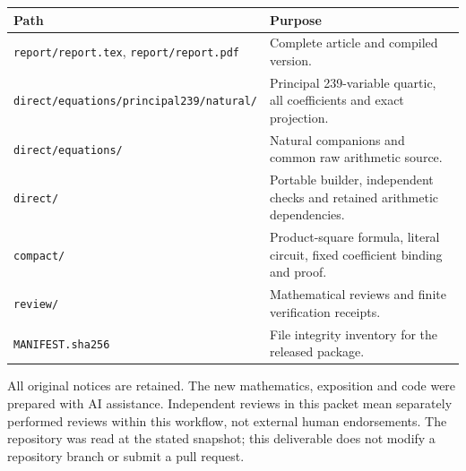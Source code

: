\documentclass[11pt]{article}
\theoremstyle{definition}\newtheorem{definition}[theorem]{Definition}
\theoremstyle{remark}\newtheorem{remark}[theorem]{Remark}
\newcommand{\code}[1]{\nolinkurl{#1}}
\begin{document}
\begin{center}\small
\begin{tabular}{p{}p{}}
\toprule
Path & Purpose\\
\midrule
\code{report/report.tex}, \code{report/report.pdf} & Complete article and compiled version.\\
\code{direct/equations/principal239/natural/} & Principal 239-variable quartic, all coefficients and exact projection.\\
\code{direct/equations/} & Natural companions and common raw arithmetic source.\\
\code{direct/} & Portable builder, independent checks and retained arithmetic dependencies.\\
\code{compact/} & Product-square formula, literal circuit, fixed coefficient binding and proof.\\
\code{review/} & Mathematical reviews and finite verification receipts.\\
\code{MANIFEST.sha256} & File integrity inventory for the released package.\\
\bottomrule
\end{tabular}
\end{center}

All original notices are retained. The new mathematics, exposition and code were prepared with AI assistance. Independent reviews in this packet mean separately performed reviews within this workflow, not external human endorsements. The repository was read at the stated snapshot; this deliverable does not modify a repository branch or submit a pull request.
\end{document}
